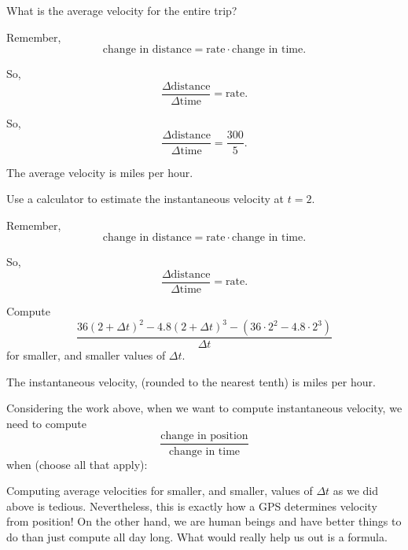 \documentclass{ximera}
\begin{document}
\begin{problem}
  What is the average velocity for the entire trip?
\begin{hint}
  Remember, 
  \[
  \text{change in distance} = \text{rate}\cdot\text{change in time}.
  \]
\end{hint}
\begin{hint}
  So, 
  \[
  \frac{\Delta\text{distance}}{\Delta\text{time}} = \text{rate}.
  \]
\end{hint}
\begin{hint}
So, 
\[
\frac{\Delta\text{distance}}{\Delta\text{time}} = \frac{300}{5}.
\]
\end{hint}
\begin{prompt}
  The average velocity is  miles per hour.
\end{prompt}
\end{problem}


\begin{problem}
  Use a calculator to estimate the instantaneous velocity at $t=2$.
  \begin{hint}
  Remember, 
  \[
  \text{change in distance} = \text{rate}\cdot\text{change in time}.
  \]
  \end{hint}
  \begin{hint}
  So, 
  \[
  \frac{\Delta\text{distance}}{\Delta\text{time}} = \text{rate}.
  \]
\end{hint}
  \begin{hint}
    Compute
    \[
    \frac{36(2+\Delta t)^2 -4.8(2+\Delta t)^3 -\left(36\cdot 2^2 -4.8\cdot 2^3\right) }{\Delta t}
    \]
    for smaller, and smaller values of $\Delta t$.
\end{hint}
  \begin{prompt}
    The instantaneous velocity, (rounded to the nearest tenth) is  miles per hour.
  \end{prompt}
\end{problem}


\begin{problem}
  Considering the work above, when we want to compute instantaneous
  velocity, we need to compute
  \[
  \frac{\text{change in position}}{\text{change in time}}
  \]
  when (choose all that apply):
  \begin{multipleChoice}%
  \end{multipleChoice}
\end{problem}


Computing average velocities for smaller, and smaller, values of
$\Delta t$ as we did above is tedious. Nevertheless, this is exactly
how a GPS determines velocity from position! On the other hand, we are
human beings and have better things to do than just compute all day
long. What would really help us out is a formula.




\end{document}
